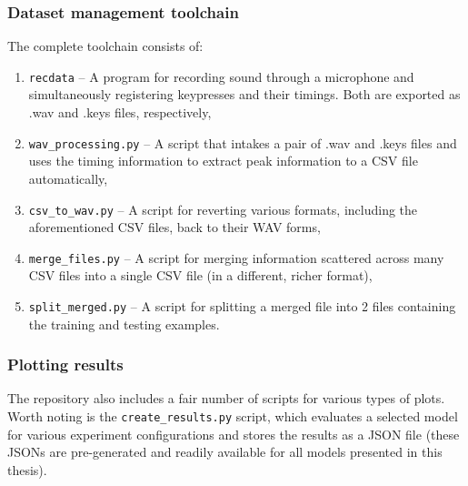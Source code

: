 \documentclass[../main.tex]{subfiles}
\begin{document}
\subsubsection*{Dataset management toolchain}
\label{sec:introduction_contribution_toolchain}
The complete toolchain consists of:
\begin{enumerate}
    \item \texttt{recdata} -- A program for recording sound through a microphone and simultaneously registering keypresses and their timings. Both are exported as .wav and .keys files, respectively,
    \item \texttt{wav\_processing.py} -- A script that intakes a pair of .wav
    and .keys files and uses the timing information to extract peak information to a CSV file automatically,
    \item \texttt{csv\_to\_wav.py} -- A script for reverting various formats, including the aforementioned CSV files, back to their WAV forms,
    \item \texttt{merge\_files.py} -- A script for merging information scattered across many CSV files into a single CSV file (in a different, richer format),
    \item \texttt{split\_merged.py} -- A script for splitting a merged file into 2 files containing the training and testing examples. 
\end{enumerate}

\subsubsection*{Plotting results}
The repository also includes a fair number of scripts for various types of plots. Worth noting is the \texttt{create\_results.py} script, which evaluates a selected model for various experiment configurations and stores the results as a JSON file (these JSONs are pre-generated and readily available for all models presented in this thesis).


\end{document}
